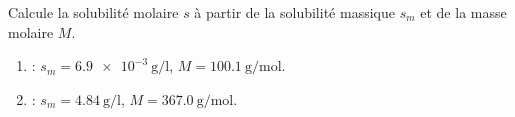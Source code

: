 \documentclass[11pt,a4paper]{article}
\begin{document}
\begin{exo}[du massique au molaire : $s = s_m/M$]
Calcule la solubilité molaire $s$ à partir de la solubilité massique $s_m$ et de la masse molaire $M$.
\begin{enumerate}[label=\alph*)]
  \item {} : $s_m=\qty{6.9e-3}{\gram\per\litre}$, $M=\qty{100.1}{\gram\per\mole}$.
  \item {} : $s_m=\qty{4.84}{\gram\per\litre}$, $M=\qty{367.0}{\gram\per\mole}$.
\end{enumerate}
\end{exo}
\end{document}
